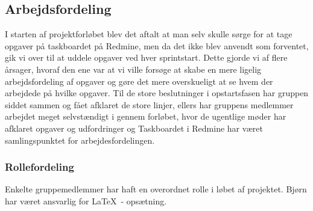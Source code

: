 \subsection{Arbejdsfordeling}
I starten af projektforløbet blev det aftalt at man selv skulle sørge for at tage opgaver på taskboardet på Redmine, men da det ikke blev anvendt som forventet, gik vi over til at uddele opgaver ved hver sprintstart. Dette gjorde vi af flere årsager, hvoraf den ene var at vi ville forsøge at skabe en mere ligelig arbejdsfordeling af opgaver og gøre det mere overskueligt at se hvem der arbejdede på hvilke opgaver. Til de store beslutninger i opstartsfasen har gruppen siddet sammen og fået afklaret de store linjer, ellers har gruppens medlemmer arbejdet meget selvstændigt i gennem forløbet, hvor de ugentlige møder har afklaret opgaver og udfordringer og Taskboardet i Redmine har været samlingspunktet for arbejdesfordelingen.

\subsubsection{Rollefordeling}
Enkelte gruppemedlemmer har haft en overordnet rolle i løbet af projektet. Bjørn har været ansvarlig for \LaTeX\ - opsætning.
